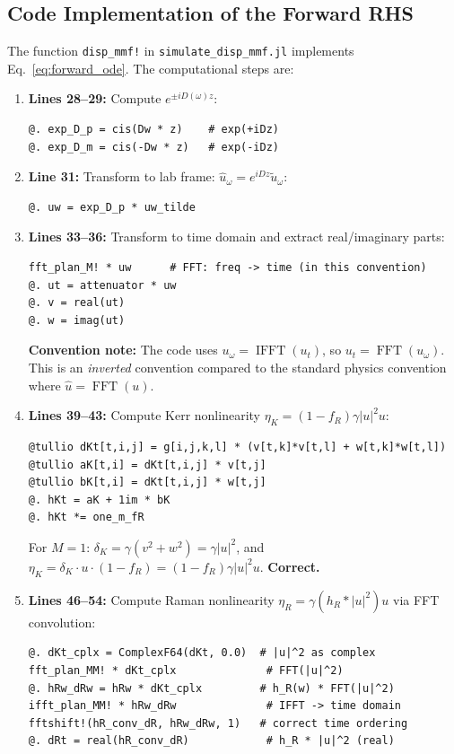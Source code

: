 \documentclass[12pt,a4paper]{article}
\newcommand{\FFT}{\operatorname{FFT}}
\newcommand{\IFFT}{\operatorname{IFFT}}
\theoremstyle{definition}
\begin{document}
\subsection{Code Implementation of the Forward RHS}

The function \texttt{disp\_mmf!} in \texttt{simulate\_disp\_mmf.jl} implements Eq.~\eqref{eq:forward_ode}. The computational steps are:

\begin{enumerate}[leftmargin=*]
\item \textbf{Lines 28--29:} Compute $e^{\pm iD(\omega)z}$:
\begin{lstlisting}
@. exp_D_p = cis(Dw * z)    # exp(+iDz)
@. exp_D_m = cis(-Dw * z)   # exp(-iDz)
\end{lstlisting}

\item \textbf{Line 31:} Transform to lab frame: $\hat{u}_\omega = e^{iDz}\tilde{u}_\omega$:
\begin{lstlisting}
@. uw = exp_D_p * uw_tilde
\end{lstlisting}

\item \textbf{Lines 33--36:} Transform to time domain and extract real/imaginary parts:
\begin{lstlisting}
fft_plan_M! * uw      # FFT: freq -> time (in this convention)
@. ut = attenuator * uw
@. v = real(ut)
@. w = imag(ut)
\end{lstlisting}

\textbf{Convention note:} The code uses $u_\omega = \IFFT(u_t)$, so $u_t = \FFT(u_\omega)$. This is an \emph{inverted} convention compared to the standard physics convention where $\hat{u} = \FFT(u)$.

\item \textbf{Lines 39--43:} Compute Kerr nonlinearity $\eta_K = (1-f_R)\gamma|u|^2 u$:
\begin{lstlisting}
@tullio dKt[t,i,j] = g[i,j,k,l] * (v[t,k]*v[t,l] + w[t,k]*w[t,l])
@tullio aK[t,i] = dKt[t,i,j] * v[t,j]
@tullio bK[t,i] = dKt[t,i,j] * w[t,j]
@. hKt = aK + 1im * bK
@. hKt *= one_m_fR
\end{lstlisting}

For $M=1$: $\delta_K = \gamma(v^2 + w^2) = \gamma|u|^2$, and $\eta_K = \delta_K \cdot u \cdot (1-f_R) = (1-f_R)\gamma|u|^2 u$. \textbf{Correct.}

\item \textbf{Lines 46--54:} Compute Raman nonlinearity $\eta_R = \gamma(h_R * |u|^2)u$ via FFT convolution:
\begin{lstlisting}
@. dKt_cplx = ComplexF64(dKt, 0.0)  # |u|^2 as complex
fft_plan_MM! * dKt_cplx              # FFT(|u|^2)
@. hRw_dRw = hRw * dKt_cplx         # h_R(w) * FFT(|u|^2)
ifft_plan_MM! * hRw_dRw              # IFFT -> time domain
fftshift!(hR_conv_dR, hRw_dRw, 1)   # correct time ordering
@. dRt = real(hR_conv_dR)            # h_R * |u|^2 (real)
\end{lstlisting}


\end{enumerate}
\end{document}

